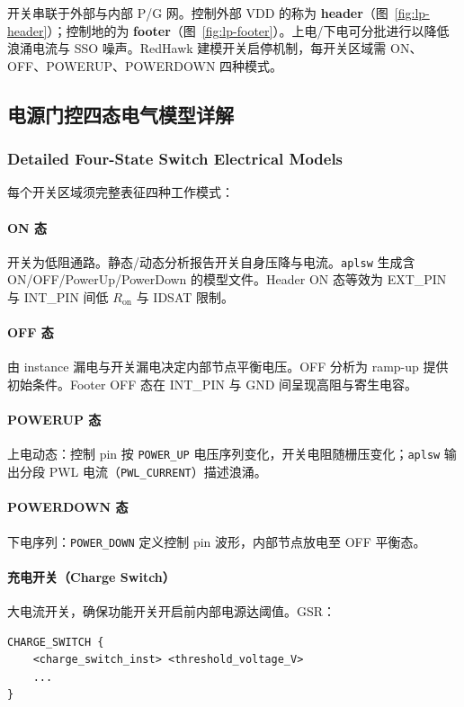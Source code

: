 开关串联于外部与内部 P/G 网。控制外部 VDD 的称为 \textbf{header}（图~\ref{fig:lp-header}）；控制地的为 \textbf{footer}（图~\ref{fig:lp-footer}）。上电/下电可分批进行以降低浪涌电流与 SSO 噪声。RedHawk 建模开关启停机制，每开关区域需 ON、OFF、POWERUP、POWERDOWN 四种模式。
\subsection{电源门控四态电气模型详解}
\subsubsection*{Detailed Four-State Switch Electrical Models}

每个开关区域须完整表征四种工作模式：

\paragraph{ON 态}
开关为低阻通路。静态/动态分析报告开关自身压降与电流。\texttt{aplsw} 生成含 ON/OFF/PowerUp/PowerDown 的模型文件。Header ON 态等效为 EXT\_PIN 与 INT\_PIN 间低 $R_{\mathrm{on}}$ 与 IDSAT 限制。

\paragraph{OFF 态}
由 instance 漏电与开关漏电决定内部节点平衡电压。OFF 分析为 ramp-up 提供初始条件。Footer OFF 态在 INT\_PIN 与 GND 间呈现高阻与寄生电容。

\paragraph{POWERUP 态}
上电动态：控制 pin 按 \texttt{POWER\_UP} 电压序列变化，开关电阻随栅压变化；\texttt{aplsw} 输出分段 PWL 电流（\texttt{PWL\_CURRENT}）描述浪涌。

\paragraph{POWERDOWN 态}
下电序列：\texttt{POWER\_DOWN} 定义控制 pin 波形，内部节点放电至 OFF 平衡态。

\paragraph{充电开关（Charge Switch）}
大电流开关，确保功能开关开启前内部电源达阈值。GSR：
\begin{lstlisting}
CHARGE_SWITCH {
    <charge_switch_inst> <threshold_voltage_V>
    ...
}
\end{lstlisting}

